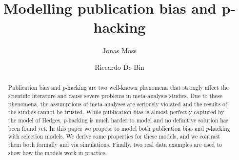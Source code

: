\documentclass[preprint, authoryear]{elsarticle}
\theoremstyle{plain}
\theoremstyle{definition}
\begin{document}
\begin{frontmatter}
\title{Modelling publication bias and p-hacking}
\author{Jonas Moss}
\author{Riccardo De Bin}
\address{Department of Mathematics, University of Oslo, PB 1053, Blindern, NO-0316, Oslo, Norway}
\begin{abstract}
Publication bias and \emph{p}-hacking are two well-known phenomena that strongly affect the scientific literature and cause severe problems in meta-analysis studies. Due to these phenomena, the assumptions of meta-analyses are seriously violated and the results of the studies cannot be trusted. While publication bias is almost perfectly captured by the model of Hedges, \emph{p}-hacking is much harder to model and no definitive solution has been found yet. In this paper we propose to model both publication bias and \emph{p}-hacking with selection models. We derive some properties for these models, and we contrast them both formally and via simulations. Finally, two real data examples are used to show how the models work in practice.
\end{abstract}
\end{frontmatter}






\end{document}
